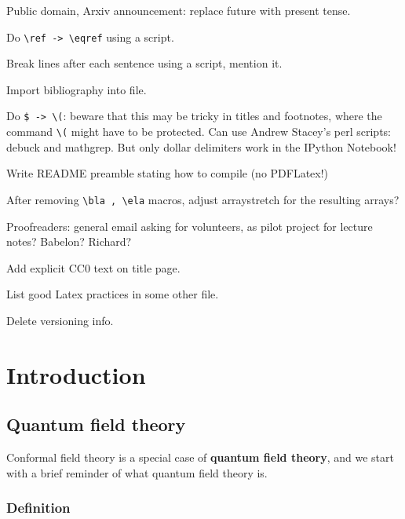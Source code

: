 \documentclass[12pt,a4paper,notitlepage]{report}
\newcommand \bla {\left\{\begin{array}{l} }
\newcommand \ela {\end{array}\right. }
\numberwithin{equation}{section}
\theoremstyle{break}
\begin{document}
Public domain, Arxiv announcement: replace future with present tense.

Do \verb+\ref -> \eqref+ using a script.

Break lines after each sentence using a script, mention it.

Import bibliography into file. 

Do \verb+$ -> \(+: beware that this may be tricky in titles and footnotes, where the command \verb+\(+ might have to be protected.
Can use Andrew Stacey's perl scripts: debuck and mathgrep. But only dollar delimiters work in the IPython Notebook!

Write README preamble stating how to compile (no PDFLatex!)

After removing \verb+\bla , \ela+ macros, adjust arraystretch for the resulting arrays? 

Proofreaders: general email asking for volunteers, as pilot project for lecture notes? Babelon? Richard? 

Add explicit CC0 text on title page. 

List good Latex practices in some other file.

Delete versioning info.


\chapter{Introduction \label{secintr}}

\section{Quantum field theory \label{secqft} }

Conformal field theory is a special case of \textbf{\boldmath quantum field theory}, and we start with a brief reminder of what quantum field theory is.

\subsection{Definition} 
\end{document}
